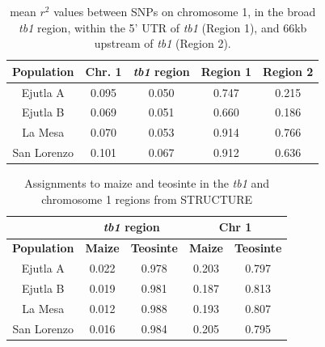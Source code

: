 \documentclass[11pt]{article} %
\begin{document}
\begin{linenumbers}
\begin{flushleft}
\clearpage

\begin{table}[htbp]
  \centering
  \caption{mean $r^{2}$ values between SNPs on chromosome 1, in the broad \emph{tb1} region, within the 5' UTR of \emph{tb1} (Region 1), and 66kb upstream of \emph{tb1} (Region 2).}
    \begin{tabular}{ccccc}\\\toprule
    \textbf{Population} & \textbf{Chr. 1} & \textbf{\emph{tb1} region} & \textbf{Region 1} & \textbf{Region 2} \\\midrule
    Ejutla A & 0.095 & 0.050 & 0.747 & 0.215 \\
    Ejutla B & 0.069 & 0.051 & 0.660 & 0.186 \\
    La Mesa & 0.070 & 0.053 & 0.914 & 0.766 \\
    San Lorenzo & 0.101 & 0.067 & 0.912 & 0.636 \\
    \bottomrule
    \end{tabular}
  \label{Table3R2}
\end{table}

\clearpage

\begin{table}[htbp]
  \centering
  \caption{Assignments to maize and teosinte in the \emph{tb1} and chromosome 1 regions from STRUCTURE}
    \begin{tabular}{ccccc} \
          & \multicolumn{2}{c}{\textbf{\emph{tb1} region}} & \multicolumn{2}{c}{\textbf{Chr 1}} \\\toprule
    \bf{Population} & \bf{Maize} & \bf{Teosinte} & \bf{Maize} & \bf{Teosinte} \\\midrule
    Ejutla A & 0.022 & 0.978 & 0.203 & 0.797 \\
    Ejutla B & 0.019 & 0.981 & 0.187 & 0.813 \\
    La Mesa & 0.012 & 0.988 & 0.193 & 0.807 \\
    San Lorenzo & 0.016 & 0.984 & 0.205 & 0.795 \\\bottomrule
    \end{tabular}
  \label{Table4Q}
\end{table}

\clearpage


\end{flushleft}
\end{linenumbers}
\end{document}
